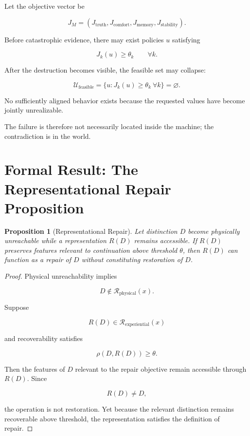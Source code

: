 \documentclass[11pt,oneside]{book}
\newtheorem{proposition}[theorem]{Proposition}
\theoremstyle{definition}
\theoremstyle{remark}
\newcommand{\R}{\mathcal{R}}
\begin{document}
Let the objective vector be

\[
J_M
=
(
J_{\mathrm{truth}},
J_{\mathrm{comfort}},
J_{\mathrm{memory}},
J_{\mathrm{stability}}
).
\]

Before catastrophic evidence, there may exist policies \(u\) satisfying

\[
J_k(u)\geq\theta_k
\qquad
\forall k.
\]

After the destruction becomes visible, the feasible set may collapse:

\[
\mathcal U_{\mathrm{feasible}}
=
\{
u:
J_k(u)\geq\theta_k
\ \forall k
\}
=
\varnothing.
\]

No sufficiently aligned behavior exists because the requested values have become jointly unrealizable.

The failure is therefore not necessarily located inside the machine; the contradiction is in the world.

\section{Formal Result: The Representational Repair Proposition}

\begin{proposition}[Representational Repair]
Let distinction \(D\) become physically unreachable while a representation \(R(D)\) remains accessible. If \(R(D)\) preserves features relevant to continuation above threshold \(\theta\), then \(R(D)\) can function as a repair of \(D\) without constituting restoration of \(D\).
\end{proposition}

\begin{proof}
Physical unreachability implies

\[
D\notin\R_{\mathrm{physical}}(x).
\]

Suppose

\[
R(D)\in\R_{\mathrm{experiential}}(x)
\]

and recoverability satisfies

\[
\rho(D,R(D))\geq\theta.
\]

Then the features of \(D\) relevant to the repair objective remain accessible through \(R(D)\). Since

\[
R(D)\neq D,
\]

the operation is not restoration. Yet because the relevant distinction remains recoverable above threshold, the representation satisfies the definition of repair.
\end{proof}
\end{document}
